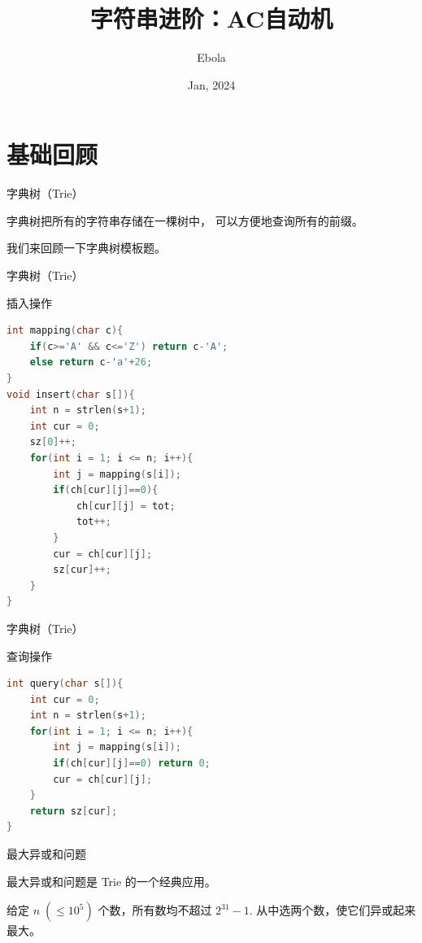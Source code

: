 \documentclass{beamer}
\author{Ebola}
\title{字符串进阶：AC自动机}
\institute{
    Institute of Mathematics, \\
    Zhejiang University.
}
\date{Jan, 2024}
\begin{document}
\begin{frame}
    \titlepage
\end{frame}

\begin{frame}
    \tableofcontents[sectionstyle=show,subsectionstyle=show/shaded/hide,subsubsectionstyle=show/shaded/hide]
\end{frame}

\section{基础回顾}

\begin{frame}{字典树（Trie）}
    \small

    字典树把所有的字符串存储在一棵树中，
    可以方便地查询所有的前缀。

    \vspace{1em}
    我们来回顾一下字典树模板题。
\end{frame}

\begin{frame}[fragile]{字典树（Trie）}
    \small

    插入操作
    \begin{lstlisting}[language=c++]
int mapping(char c){
    if(c>='A' && c<='Z') return c-'A';
    else return c-'a'+26;
}
void insert(char s[]){
    int n = strlen(s+1);
    int cur = 0;
    sz[0]++;
    for(int i = 1; i <= n; i++){
        int j = mapping(s[i]);
        if(ch[cur][j]==0){
            ch[cur][j] = tot;
            tot++;
        }
        cur = ch[cur][j];
        sz[cur]++;
    }
}
    \end{lstlisting}
\end{frame}

\begin{frame}[fragile]{字典树（Trie）}
    \small

    查询操作
    \begin{lstlisting}[language=c++]
int query(char s[]){
    int cur = 0;
    int n = strlen(s+1);
    for(int i = 1; i <= n; i++){
        int j = mapping(s[i]);
        if(ch[cur][j]==0) return 0;
        cur = ch[cur][j];
    }
    return sz[cur];
}
    \end{lstlisting}
\end{frame}

\begin{frame}{最大异或和问题}
    \small

    最大异或和问题是 Trie 的一个经典应用。

    \vspace{1em}
    给定 $n\;(\leq 10^5)$ 个数，所有数均不超过 $2^{31}-1$.
    从中选两个数，使它们异或起来最大。 
\end{frame}
\end{document}
